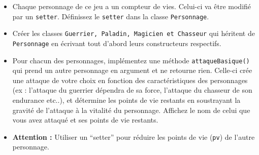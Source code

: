 \begin{Exercice}[15 minutes]
\begin{itemize}
        \item Chaque personnage de ce jeu a un compteur de vies. Celui-ci va être modifié par un \lstinline{setter}. Définissez le \lstinline{setter} dans la classe \lstinline{Personnage}.
        \item Créer les classes \lstinline{Guerrier, Paladin, Magicien et Chasseur} qui héritent de \lstinline{Personnage} en écrivant tout d’abord leurs constructeurs respectifs. 
        
        
    
        \item Pour chacun des personnages, implémentez une méthode \lstinline{attaqueBasique()} qui prend un autre personnage en argument et ne retourne rien. Celle-ci crée une attaque de votre choix en fonction des caractéristiques des personnages (ex : l’attaque du guerrier dépendra de sa force, l’attaque du chasseur de son endurance etc..), et détermine les points de vie restants en soustrayant la gravité de l'attaque à la vitalité du personnage. Affichez le nom de celui que vous avez attaqué et ses points de vie restants.
        \item \textbf{Attention :} Utiliser un ``setter'' pour réduire les points de vie (\lstinline{pv}) de l’autre personnage.
        
        
    \end{itemize}
    
    \begin{solution}
        
    \end{solution}
    \begin{solution}
        
    \end{solution}
    
    \begin{solution}
        
    \end{solution}
    \begin{solution}
        
    \end{solution}
    \end{Exercice}
    
  
    
